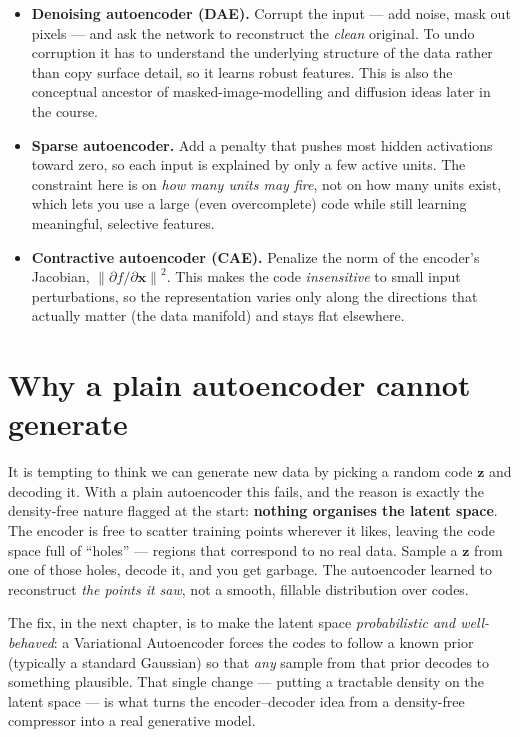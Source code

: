 \documentclass[11pt, oneside]{book}
\newcommand{\norm}[1]{\left\lVert #1 \right\rVert}
\newcommand{\xvec}{\mathbf{x}}
\newcommand{\zvec}{\mathbf{z}}
\begin{document}
\begin{itemize}
  \item \textbf{Denoising autoencoder (DAE).} Corrupt the input --- add noise,
        mask out pixels --- and ask the network to reconstruct the \emph{clean}
        original. To undo corruption it has to understand the underlying
        structure of the data rather than copy surface detail, so it learns robust
        features. This is also the conceptual ancestor of masked-image-modelling
        and diffusion ideas later in the course.
  \item \textbf{Sparse autoencoder.} Add a penalty that pushes most hidden
        activations toward zero, so each input is explained by only a few active
        units. The constraint here is on \emph{how many units may fire}, not on how
        many units exist, which lets you use a large (even overcomplete) code while
        still learning meaningful, selective features.
  \item \textbf{Contractive autoencoder (CAE).} Penalize the norm of the encoder's
        Jacobian, $\norm{\partial f / \partial \xvec}^2$. This makes the code
        \emph{insensitive} to small input perturbations, so the representation
        varies only along the directions that actually matter (the data manifold)
        and stays flat elsewhere.
\end{itemize}

\section{Why a plain autoencoder cannot generate}

It is tempting to think we can generate new data by picking a random code $\zvec$
and decoding it. With a plain autoencoder this fails, and the reason is exactly
the density-free nature flagged at the start: \textbf{nothing organises the latent
space}. The encoder is free to scatter training points wherever it likes, leaving
the code space full of ``holes'' --- regions that correspond to no real data.
Sample a $\zvec$ from one of those holes, decode it, and you get garbage. The
autoencoder learned to reconstruct \emph{the points it saw}, not a smooth,
fillable distribution over codes.

\begin{notebox}[title={The gap the VAE fills}]
The fix, in the next chapter, is to make the latent space \emph{probabilistic and
well-behaved}: a Variational Autoencoder forces the codes to follow a known prior
(typically a standard Gaussian) so that \emph{any} sample from that prior decodes
to something plausible. That single change --- putting a tractable density on the
latent space --- is what turns the encoder--decoder idea from a density-free
compressor into a real generative model.
\end{notebox}
\end{document}
